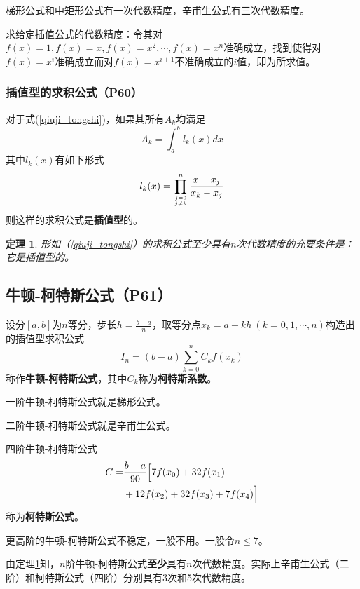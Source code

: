 \documentclass[fontset=ubuntu]{ctexart}
\newtheorem{theorem}{定理}
\numberwithin{equation}{section}
\numberwithin{theorem}{section}
\begin{document}
\begin{multicols}{2}
    梯形公式和中矩形公式有一次代数精度，辛甫生公式有三次代数精度。

    求给定插值公式的代数精度：令其对$f(x)=1,f(x)=x,f(x)=x^2,\cdots,f(x)=x^n$准确成立，找到使得对$f(x)=x^i$准确成立而对$f(x)=x^{i+1}$不准确成立的$i$值，即为所求值。

    \subsubsection{插值型的求积公式（P60）}

    对于式(\ref{qiuji_tongshi})，如果其所有$A_k$均满足
    \begin{equation}
        A_k = \int_{a}^{b}l_k(x)dx
    \end{equation}
    其中$l_k(x)$有如下形式
    \begin{equation*}
        l_k(x) = \prod_{j=0\atop j\neq k}^{n}\frac{x-x_j}{x_k-x_j}
    \end{equation*}
    则这样的求积公式是\textbf{插值型}的。

    \begin{theorem}
        \label{chazhi}
        形如（\ref{qiuji_tongshi}）的求积公式至少具有$n$次代数精度的充要条件是：它是插值型的。
    \end{theorem}

    \subsection{牛顿-柯特斯公式（P61）}

    设分$[a,b]$为$n$等分，步长$h=\frac{b-a}{n}$，取等分点$x_k=a+kh\ (k=0,1,\cdots,n)$构造出的插值型求积公式
    \begin{equation}
        I_n = (b-a)\sum_{k=0}^{n}C_kf(x_k)
    \end{equation}
    称作\textbf{牛顿-柯特斯公式}，其中$C_k$称为\textbf{柯特斯系数}。

    一阶牛顿-柯特斯公式就是梯形公式。

    二阶牛顿-柯特斯公式就是辛甫生公式。

    四阶牛顿-柯特斯公式
    \begin{align}
        C=&\frac{b-a}{90}\Bigl[ 7f(x_0)+32f(x_1) \nonumber \\
        &+12f(x_2)+32f(x_3)+7f(x_4)\Bigr]
    \end{align}
    称为\textbf{柯特斯公式}。

    更高阶的牛顿-柯特斯公式不稳定，一般不用。一般令$n\leq 7$。

    由定理\ref{chazhi}知，$n$阶牛顿-柯特斯公式\textbf{至少}具有$n$次代数精度。实际上辛甫生公式（二阶）和柯特斯公式（四阶）分别具有3次和5次代数精度。


\end{multicols}
\end{document}
